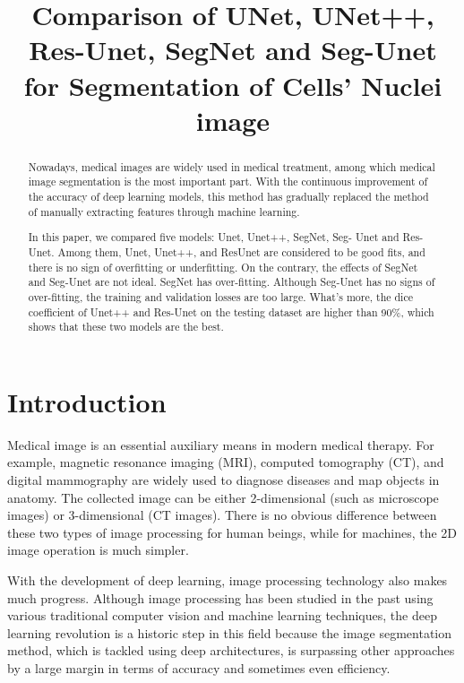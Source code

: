 \documentclass{article}
\title{Comparison of UNet, UNet++, Res-Unet, SegNet and Seg-Unet for Segmentation of Cells' Nuclei image}
\begin{document}
%
\maketitle
%

\begin{abstract}
    Nowadays, medical images are widely used in medical treatment, among which medical image segmentation is the most important part. With the continuous improvement of the accuracy of deep learning models, this method has gradually replaced the method of manually extracting features through machine learning.

    In this paper, we compared five models: Unet, Unet++, SegNet, Seg- Unet and Res-Unet. Among them, Unet, Unet++, and ResUnet are considered to be good fits, and there is no sign of overfitting or underfitting. On the contrary, the effects of SegNet and Seg-Unet are not ideal. SegNet has over-fitting. Although Seg-Unet has no signs of over-fitting, the training and validation losses are too large. What’s more, the dice coefficient of Unet++ and Res-Unet on the testing dataset are higher than 90\%, which shows that these two models are the best.

\end{abstract}

\section{Introduction}
Medical image is an essential auxiliary means in modern medical therapy.
For example, magnetic resonance imaging (MRI), computed tomography (CT), and digital mammography are widely used to diagnose diseases and map objects in anatomy.\cite{pham2000current}
The collected image can be either 2-dimensional (such as microscope images) or 3-dimensional (CT images).
There is no obvious difference between these two types of image processing for human beings, while for machines, the 2D image operation is much simpler.

With the development of deep learning, image processing technology also makes much progress.
Although image processing has been studied in the past using various traditional computer vision and machine learning techniques, the deep learning revolution is a historic step in this field because the image segmentation method, which is tackled using deep architectures, is surpassing other approaches by a large margin in terms of accuracy and sometimes even efficiency.\cite{DBLP:journals/corr/Garcia-GarciaOO17}
\end{document}
